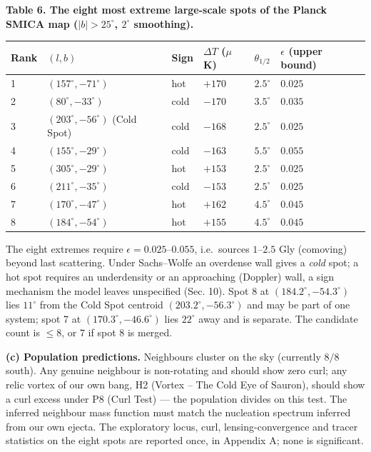 \documentclass[
  11pt,
]{article}
\begin{document}
\textbf{Table 6. The eight most extreme large-scale spots of the Planck
SMICA map (\(|b| > 25^\circ\), \(2^\circ\) smoothing).}

\begin{longtable}[]{@{}llllll@{}}
\toprule
Rank & \((l, b)\) & Sign & \(\Delta T\) (\(\mu\)K) & \(\theta_{1/2}\) &
\(\epsilon\) (upper bound)\tabularnewline
\midrule
\endhead
1 & \((157^\circ, -71^\circ)\) & hot & \(+170\) & \(2.5^\circ\) &
\(0.025\)\tabularnewline
2 & \((80^\circ, -33^\circ)\) & cold & \(-170\) & \(3.5^\circ\) &
\(0.035\)\tabularnewline
3 & \((203^\circ, -56^\circ)\) (Cold Spot) & cold & \(-168\) &
\(2.5^\circ\) & \(0.025\)\tabularnewline
4 & \((155^\circ, -29^\circ)\) & cold & \(-163\) & \(5.5^\circ\) &
\(0.055\)\tabularnewline
5 & \((305^\circ, -29^\circ)\) & hot & \(+153\) & \(2.5^\circ\) &
\(0.025\)\tabularnewline
6 & \((211^\circ, -35^\circ)\) & cold & \(-153\) & \(2.5^\circ\) &
\(0.025\)\tabularnewline
7 & \((170^\circ, -47^\circ)\) & hot & \(+162\) & \(4.5^\circ\) &
\(0.045\)\tabularnewline
8 & \((184^\circ, -54^\circ)\) & hot & \(+155\) & \(4.5^\circ\) &
\(0.045\)\tabularnewline
\bottomrule
\end{longtable}

The eight extremes require \(\epsilon = 0.025\)--\(0.055\), i.e.~sources
\(1\)--\(2.5\) Gly (comoving) beyond last scattering. Under Sachs--Wolfe
an overdense wall gives a \emph{cold} spot; a hot spot requires an
underdensity or an approaching (Doppler) wall, a sign mechanism the
model leaves unspecified (Sec. 10). Spot 8 at
\((184.2^\circ, -54.3^\circ)\) lies \(11^\circ\) from the Cold Spot
centroid \((203.2^\circ, -56.3^\circ)\) and may be part of one system;
spot 7 at \((170.3^\circ, -46.6^\circ)\) lies \(22^\circ\) away and is
separate. The candidate count is \(\leq 8\), or \(7\) if spot 8 is
merged.

\textbf{(c) Population predictions.} Neighbours cluster on the sky
(currently \(8/8\) south). Any genuine neighbour is non-rotating and
should show zero curl; any relic vortex of our own bang, H2 (Vortex --
The Cold Eye of Sauron), should show a curl excess under P8 (Curl Test)
--- the population divides on this test. The inferred neighbour mass
function must match the nucleation spectrum inferred from our own
ejecta. The exploratory locus, curl, lensing-convergence and tracer
statistics on the eight spots are reported once, in Appendix A; none is
significant.
\end{document}
